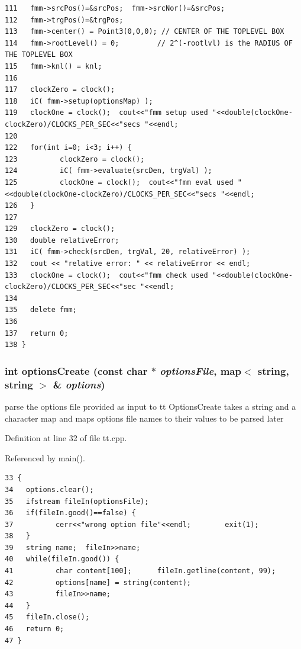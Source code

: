 \begin{verbatim}
111   fmm->srcPos()=&srcPos;  fmm->srcNor()=&srcPos;
112   fmm->trgPos()=&trgPos;
113   fmm->center() = Point3(0,0,0); // CENTER OF THE TOPLEVEL BOX
114   fmm->rootLevel() = 0;         // 2^(-rootlvl) is the RADIUS OF THE TOPLEVEL BOX
115   fmm->knl() = knl;
116   
117   clockZero = clock();
118   iC( fmm->setup(optionsMap) );
119   clockOne = clock();  cout<<"fmm setup used "<<double(clockOne-clockZero)/CLOCKS_PER_SEC<<"secs "<<endl;
120   
122   for(int i=0; i<3; i++) {
123          clockZero = clock();
124          iC( fmm->evaluate(srcDen, trgVal) );
125          clockOne = clock();  cout<<"fmm eval used "<<double(clockOne-clockZero)/CLOCKS_PER_SEC<<"secs "<<endl;
126   }
127   
129   clockZero = clock();
130   double relativeError;
131   iC( fmm->check(srcDen, trgVal, 20, relativeError) );
132   cout << "relative error: " << relativeError << endl;
133   clockOne = clock();  cout<<"fmm check used "<<double(clockOne-clockZero)/CLOCKS_PER_SEC<<"sec "<<endl;
134   
135   delete fmm;
136   
137   return 0;
138 }
\end{verbatim}\normalsize 


\subsubsection{\setlength{\rightskip}{0pt plus 5cm}int options\-Create (const char $\ast$ {\em options\-File}, map$<$ string, string $>$ \& {\em options})}\label{tt_8cpp_2899a15f18e0573fa64d805ec5b40754_2899a15f18e0573fa64d805ec5b40754}


parse the options file provided as input to tt Options\-Create takes a string and a character map and maps options file names to their values to be parsed later 

Definition at line 32 of file tt.cpp.

Referenced by main().

\footnotesize\begin{verbatim}33 {
34   options.clear();
35   ifstream fileIn(optionsFile);
36   if(fileIn.good()==false) {
37          cerr<<"wrong option file"<<endl;        exit(1);
38   }
39   string name;  fileIn>>name;
40   while(fileIn.good()) {
41          char content[100];      fileIn.getline(content, 99);
42          options[name] = string(content);
43          fileIn>>name;
44   }
45   fileIn.close();
46   return 0;
47 }
\end{verbatim}\normalsize 


